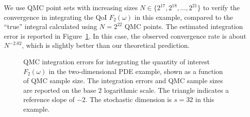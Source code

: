 \documentclass[namedate,webpdf,imanum]{ima-authoring-arxiv}%
\theoremstyle{thmstyletwo}%
\numberwithin{equation}{section}
\begin{document}
We use QMC point sets with increasing sizes $N \in \{2^{17}, 2^{18}, \ldots, 2^{21}\}$ to verify the convergence in integrating the QoI $F_2(\omega)$ in this example, compared to the ``true'' integral calculated using $N = 2^{22}$ QMC points. The estimated integration error is reported in Figure~\ref{fig:2dpde}. In this case, the observed convergence rate is about $N^{-2.02}$, which is slightly better than our theoretical prediction. 

\begin{figure}
\centering
{}
\caption{QMC integration errors for integrating the quantity of interest $F_2(\omega)$ in the two-dimensional PDE example, shown as a function of QMC sample size. The integration errors and QMC sample sizes are reported on the base $2$ logarithmic scale. The triangle indicates a reference slope of $-2$. The stochastic dimension is $s=32$ in this example. }\label{fig:2dpde}
\end{figure}
\end{document}
